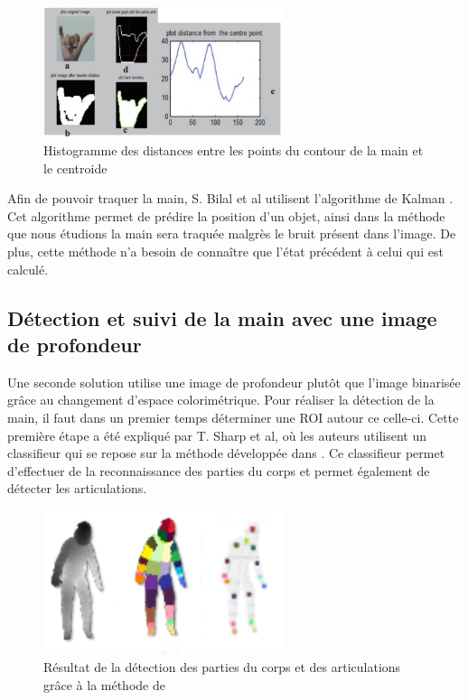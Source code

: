 \begin{figure}[!h]
\center
\includegraphics[width=7cm]{images/handHisto.png}
\caption{Histogramme des distances entre les points du contour de la main et le centroide}
\label{fig:handHisto}
\end{figure}

Afin de pouvoir traquer la main, S. Bilal et al \cite{haarlike} utilisent l'algorithme de Kalman \cite{kalman}.
Cet algorithme permet de prédire la position d'un objet, ainsi dans la méthode que nous étudions la main sera traquée malgrès
le bruit présent dans l'image. De plus, cette méthode n'a besoin de connaître que l'état précédent à celui 
qui est calculé.

\subsection{Détection et suivi de la main avec une image de profondeur}
Une seconde solution utilise une image de profondeur plutôt que l'image binarisée grâce au changement d'espace colorimétrique.
Pour réaliser la détection de la main, il faut dans un premier temps déterminer une ROI
autour ce celle-ci. Cette première étape a été expliqué par T. Sharp et al\cite{export:238453}, où les auteurs utilisent un classifieur
qui se repose sur la méthode développée dans \cite{export:145347}. Ce classifieur permet d'effectuer de la reconnaissance
des parties du corps et permet également de détecter les articulations.
\begin{figure}[!h]
 \begin{center}
  \includegraphics[width=7cm]{images/bodyrecognition.png}
  \caption{Résultat de la détection des parties du corps et des articulations grâce à la méthode de \cite{export:145347}}
  \label{fig:bodyrecognition}
 \end{center}
\end{figure}

